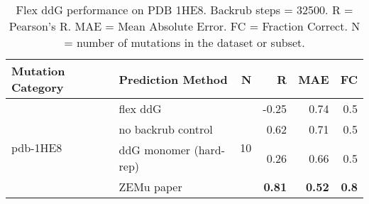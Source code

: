 \begin{table}
  \begin{tabular}{llrrrr}
\toprule
Mutation Category &       Prediction Method &   N &     R &  MAE &  FC \\
\midrule
 \multirow{ 4}{*}{pdb-1HE8} & flex ddG & \multirow{ 4}{*}{10} & -0.25 & 0.74 & 0.5  \\
 & no backrub control & & 0.62 & 0.71 & 0.5  \\
 & ddG monomer (hard-rep) & & 0.26 & 0.66 & 0.5  \\
 & ZEMu paper & & \textbf{0.81} & \textbf{0.52} & \textbf{0.8}  \\
\bottomrule
\end{tabular}
  \caption[Flex ddG performance on PDB 1HE8]{
    Flex ddG performance on PDB 1HE8. Backrub steps = 32500. R = Pearson's R. MAE = Mean Absolute Error. FC = Fraction Correct. N = number of mutations in the dataset or subset.
  } \label{tab:table-pdb-1HE8}
\end{table}
